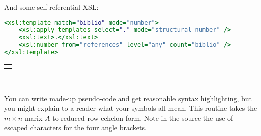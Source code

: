 \documentclass[10pt,]{article}
\theoremstyle{plain}
\theoremstyle{definition}
\theoremstyle{definition}
\theoremstyle{definition}
\theoremstyle{definition}
\theoremstyle{definition}
\theoremstyle{definition}
\numberwithin{equation}{section}
\newlength{\panelmax}
\begin{document}
\par
\hypertarget{p-621}{}%
And some self-referential XSL:%
{%
\setlength{\panelmax}{0pt}
\ifdefined\panelboxAprogram\else\newsavebox{\panelboxAprogram}\fi%
\begin{lrbox}{\panelboxAprogram}
\begin{lstlisting}[style=genericinput, language=XSLT, linewidth=0.7\linewidth]
<xsl:template match="biblio" mode="number">
    <xsl:apply-templates select="." mode="structural-number" />
    <xsl:text>.</xsl:text>
    <xsl:number from="references" level="any" count="biblio" />
</xsl:template>
\end{lstlisting}
\end{lrbox}
\ifdefined\phAprogram\else\newlength{\phAprogram}\fi%
\setlength{\phAprogram}{\ht\panelboxAprogram+\dp\panelboxAprogram}
\settototalheight{\phAprogram}{\usebox{\panelboxAprogram}}
\setlength{\panelmax}{\maxof{\panelmax}{\phAprogram}}
\leavevmode%
\setlength{\tabcolsep}{0\linewidth}
\par\medskip\noindent
\hspace*{0.15\linewidth}%
\begin{tabular}{@{}*{1}{c}@{}}
\begin{minipage}[c][\panelmax][t]{0.7\linewidth}\usebox{\panelboxAprogram}\end{minipage}\end{tabular}\\
}%
\par
\hypertarget{p-622}{}%
You can write made-up pseudo-code and get reasonable syntax highlighting, but you might explain to a reader what your symbols all mean.  This routine takes the \(m\times n\) marix \(A\) to reduced row-echelon form.  Note in the source the use of escaped characters for the four angle brackets.%
\end{document}
